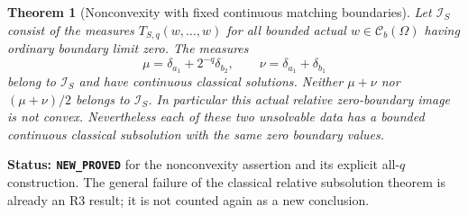 \documentclass[11pt,a4paper]{article}
\numberwithin{equation}{section}
\newtheorem{theorem}{Theorem}[section]
\theoremstyle{definition}
\theoremstyle{remark}
\begin{document}
\begin{theorem}[Nonconvexity with fixed continuous matching boundaries]
\label{thm:r6-relative-dirichlet-image-nonconvex}
Let $\mathscr I_S$ consist of the measures
$T_{S,q}(w,\ldots,w)$ for all bounded actual
$w\in\mathcal C_b(\Omega)$ having ordinary boundary limit zero.
The measures
\[
             \mu=\delta_{a_1}+2^{-q}\delta_{b_2},\qquad
             \nu=\delta_{a_1}+\delta_{b_1}
\]
belong to $\mathscr I_S$ and have continuous classical solutions.
Neither $\mu+\nu$ nor $(\mu+\nu)/2$ belongs to $\mathscr I_S$.
In particular this actual relative zero-boundary image is not convex.
Nevertheless each of these two unsolvable data has a bounded
continuous classical subsolution with the same zero boundary values.
\end{theorem}

\noindent\textbf{Status: \texttt{NEW\_PROVED}} for the nonconvexity
assertion and its explicit all-$q$ construction. The general failure
of the classical relative subsolution theorem is already an R3 result;
it is not counted again as a new conclusion.
\end{document}
